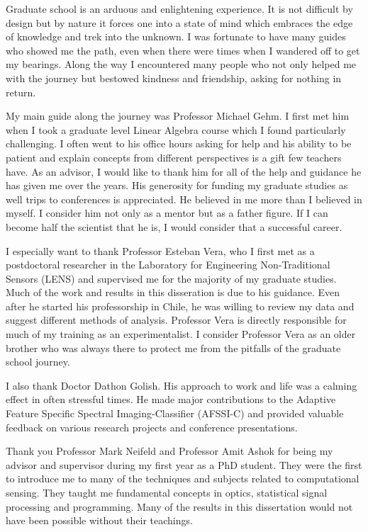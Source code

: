 Graduate school is an arduous and enlightening experience. It is not difficult by design but by nature it forces one into a state of mind which embraces the edge of knowledge and trek into the unknown. I was fortunate to have many guides who showed me the path, even when there were times when I wandered off to get my bearings. Along the way I encountered many people who not only helped me with the journey but bestowed kindness and friendship, asking for nothing in return.

My main guide along the journey was Professor Michael Gehm. I first met him when I took a graduate level Linear Algebra course which I found particularly challenging. I often went to his office hours asking for help and his ability to be patient and explain concepts from different perspectives is a gift few teachers have. As an advisor, I would like to thank him for all of the help and guidance he has given me over the years. His generosity for funding my graduate studies as well trips to conferences is appreciated. He believed in me more than I believed in myself. I consider him not only as a mentor but as a father figure. If I can become half the scientist that he is, I would consider that a successful career.

I especially want to thank Professor Esteban Vera, who I first met as a postdoctoral researcher in the Laboratory for Engineering Non-Traditional Sensors (LENS) and supervised me for the majority of my graduate studies. Much of the work and results in this disseration is due to his guidance. Even after he started his professorship in Chile, he was willing to review my data and suggest different methods of analysis. Professor Vera is directly responsible for much of my training as an experimentalist. I consider Professor Vera as an older brother who was always there to protect me from the pitfalls of the graduate school journey. 

I also thank Doctor Dathon Golish. His approach to work and life was a calming effect in often stressful times. He made major contributions to the Adaptive Feature Specific Spectral Imaging-Classifier (AFSSI-C) and provided valuable feedback on various research projects and conference presentations.

Thank you Professor Mark Neifeld and Professor Amit Ashok for being my advisor and supervisor during my first year as a PhD student. They were the first to introduce me to many of the techniques and subjects related to computational sensing. They taught me fundamental concepts in optics, statistical signal processing and programming. Many of the results in this dissertation would not have been possible without their teachings.


